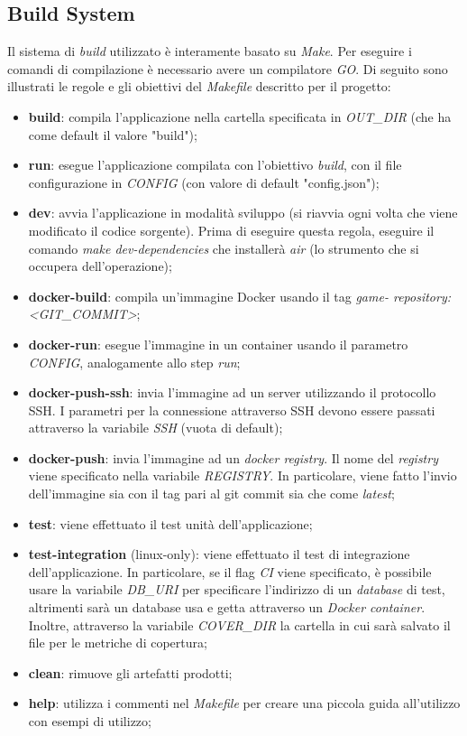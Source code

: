 \documentclass{article}
\begin{document}
\subsection{Build System}
Il sistema di \textit{build} utilizzato è interamente basato su \textit{Make}. Per eseguire i comandi di compilazione è necessario avere un compilatore \textit{GO}. Di seguito sono illustrati le regole e gli obiettivi del \textit{Makefile} descritto per il progetto:
\begin{itemize}
    \item \textbf{build}: compila l'applicazione nella cartella specificata in \textit{OUT\_DIR} (che ha come default il valore "build");
    \item \textbf{run}: esegue l'applicazione compilata con l'obiettivo \textit{build}, con il file configurazione in \textit{CONFIG} (con valore di default "config.json");
    \item \textbf{dev}: avvia l'applicazione in modalità sviluppo (si riavvia ogni volta che viene modificato il codice sorgente). Prima di eseguire questa regola, eseguire il comando \textit{make dev-dependencies} che installerà \textit{air} (lo strumento che si occupera dell'operazione);
    \item \textbf{docker-build}: compila un'immagine Docker usando il tag \textit{game- repository: <GIT\_COMMIT>};
    \item \textbf{docker-run}: esegue l'immagine in un container usando il parametro \textit{CONFIG}, analogamente allo step \textit{run};
    \item \textbf{docker-push-ssh}: invia l'immagine ad un server utilizzando il protocollo SSH. I parametri per la connessione attraverso SSH devono essere passati attraverso la variabile \textit{SSH} (vuota di default);
    \item \textbf{docker-push}: invia l'immagine ad un \textit{docker registry}. Il nome del \textit{registry} viene specificato nella variabile \textit{REGISTRY}. In particolare, viene fatto l'invio dell'immagine sia con il tag pari al git commit sia che come \textit{latest};
    \item \textbf{test}: viene effettuato il test unità dell'applicazione;
    \item \textbf{test-integration} (linux-only): viene effettuato il test di integrazione dell'applicazione. In particolare, se il flag \textit{CI} viene specificato, è possibile usare la variabile \textit{DB\_URI} per specificare l'indirizzo di un \textit{database} di test, altrimenti sarà un database usa e getta attraverso un \textit{Docker container}. Inoltre, attraverso la variabile \textit{COVER\_DIR} la cartella in cui sarà salvato il file per le metriche di copertura;
    \item \textbf{clean}: rimuove gli artefatti prodotti;
    \item \textbf{help}: utilizza i commenti nel \textit{Makefile} per creare una piccola guida all'utilizzo con esempi di utilizzo;
\end{itemize}
\end{document}
